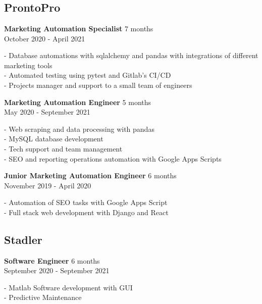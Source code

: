 \section{\faBriefcase} \label{sec:experience}

\subsection{ProntoPro}
\textbf{Marketing Automation Specialist} \hfill 7 months \\ 
{\footnotesize October 2020 - April 2021} \\
{
    \raggedright
    - Database automations with sqlalchemy and pandas with
    integrations of different marketing tools \\
    - Automated testing using pytest and Gitlab's CI/CD \\
    - Projects manager and support to a small team of engineers \\
}

\textbf{Marketing Automation Engineer} \hfill 5 months \\ 
{\footnotesize May 2020 - September 2021} \\
{
    \raggedright
    - Web scraping and data processing with pandas \\
    - MySQL database development \\
    - Tech support and team management \\
    - SEO and reporting operations automation with Google Apps Scripts \\
}

\textbf{Junior Marketing Automation Engineer} \hfill 6 months \\ 
{\footnotesize November 2019 - April 2020} \\
{
    \raggedright
    - Automation of SEO tasks with Google Apps Script \\
    - Full stack web development with Django and React \\
}

\medskip
\subsection{Stadler}
\textbf{Software Engineer} \hfill 6 months \\ 
{\footnotesize September 2020 - September 2021} \\
{
    \raggedright
    - Matlab Software development with GUI \\
    - Predictive Maintenance \\
}